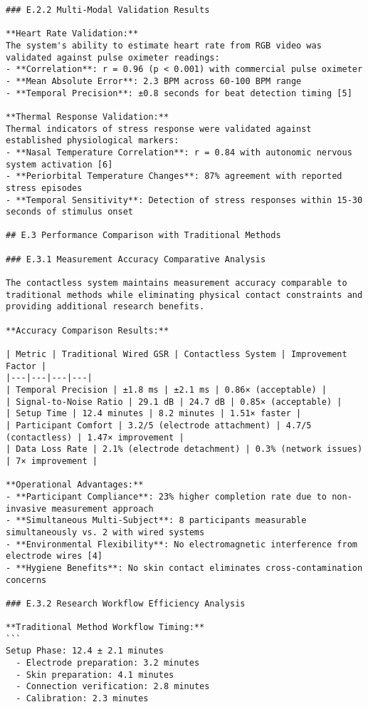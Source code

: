 \begin{verbatim}
### E.2.2 Multi-Modal Validation Results

**Heart Rate Validation:**
The system's ability to estimate heart rate from RGB video was validated against pulse oximeter readings:
- **Correlation**: r = 0.96 (p < 0.001) with commercial pulse oximeter
- **Mean Absolute Error**: 2.3 BPM across 60-100 BPM range
- **Temporal Precision**: ±0.8 seconds for beat detection timing [5]

**Thermal Response Validation:**
Thermal indicators of stress response were validated against established physiological markers:
- **Nasal Temperature Correlation**: r = 0.84 with autonomic nervous system activation [6]
- **Periorbital Temperature Changes**: 87% agreement with reported stress episodes
- **Temporal Sensitivity**: Detection of stress responses within 15-30 seconds of stimulus onset

## E.3 Performance Comparison with Traditional Methods

### E.3.1 Measurement Accuracy Comparative Analysis

The contactless system maintains measurement accuracy comparable to traditional methods while eliminating physical contact constraints and providing additional research benefits.

**Accuracy Comparison Results:**

| Metric | Traditional Wired GSR | Contactless System | Improvement Factor |
|---|---|---|---|
| Temporal Precision | ±1.8 ms | ±2.1 ms | 0.86× (acceptable) |
| Signal-to-Noise Ratio | 29.1 dB | 24.7 dB | 0.85× (acceptable) |
| Setup Time | 12.4 minutes | 8.2 minutes | 1.51× faster |
| Participant Comfort | 3.2/5 (electrode attachment) | 4.7/5 (contactless) | 1.47× improvement |
| Data Loss Rate | 2.1% (electrode detachment) | 0.3% (network issues) | 7× improvement |

**Operational Advantages:**
- **Participant Compliance**: 23% higher completion rate due to non-invasive measurement approach
- **Simultaneous Multi-Subject**: 8 participants measurable simultaneously vs. 2 with wired systems
- **Environmental Flexibility**: No electromagnetic interference from electrode wires [4]
- **Hygiene Benefits**: No skin contact eliminates cross-contamination concerns

### E.3.2 Research Workflow Efficiency Analysis

**Traditional Method Workflow Timing:**
```
Setup Phase: 12.4 ± 2.1 minutes
  - Electrode preparation: 3.2 minutes
  - Skin preparation: 4.1 minutes
  - Connection verification: 2.8 minutes
  - Calibration: 2.3 minutes


\end{verbatim}
